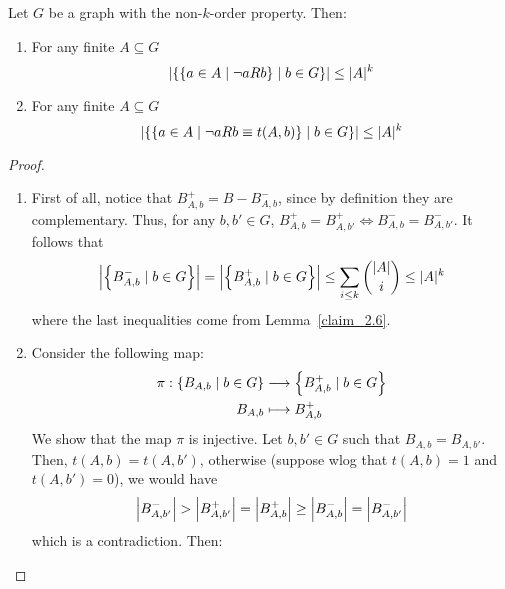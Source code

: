     \begin{corollary}[Claim 2.6.1] \label{itm:2.6.1}
        Let $G$ be a graph with the non-$k$-order property.
        Then:
        \begin{enumerate}
            \item\label{itm:2.6.1.1} For any finite $A \subseteq G$
                \[
                    \left| \left\{ \left\{ a \in A \mid \neg a R b \right\} \mid b \in G \right\} \right|
                        \leq |A|^k
                \]
            \item\label{itm:2.6.1.2} For any finite $A \subseteq G$
                \[
                    \left| \left\{ \left\{ a \in A \mid \neg a R b \equiv t(A,b) \right\} \mid b \in G \right\} \right|
                        \leq |A|^k
                \]
        \end{enumerate}
        \begin{proof}
        \begin{enumerate}
            \item First of all, notice that $B^+_{A,b} = B - B^-_{A,b}$, since by definition they are complementary.
                Thus, for any $b, b' \in G$, $B^+_{A,b} = B^+_{A,b'} \Leftrightarrow B^-_{A,b} = B^-_{A,b'}$.
                It follows that
                \[
                    \left| \left\{ B^-_{A,b} \mid b \in G \right\} \right| =
                    \left| \left\{ B^+_{A,b} \mid b \in G \right\} \right| \leq
                    \sum_{i \leq k} \binom{|A|}{i} \leq |A|^k
                \]
                where the last inequalities come from Lemma~\ref{claim_2.6}.
            \item Consider the following map:
                \begin{align*}
                    \pi: \left\{ B_{A,b} \mid b \in G \right\} & \longrightarrow \left\{ B^+_{A,b} \mid b \in G \right\} \\
                                                       B_{A,b} & \longmapsto B^+_{A,b}
                \end{align*}
                We show that the map $\pi$ is injective.
                Let $b,b' \in G$ such that $B_{A,b} = B_{A,b'}$.
                Then, $t(A,b) = t(A,b')$, otherwise (suppose wlog that $t(A,b) = 1$ and $t(A,b') = 0$), we would have
                \[
                    \left| B^-_{A,b'} \right| > \left| B^+_{A,b'} \right| = \left| B^+_{A,b} \right| \geq
                        \left| B^-_{A,b} \right| = \left| B^-_{A,b'} \right|
                \]
                which is a contradiction.
                Then:
                \begin{itemize}

\end{itemize}
\end{enumerate}
\end{proof}
\end{corollary}
